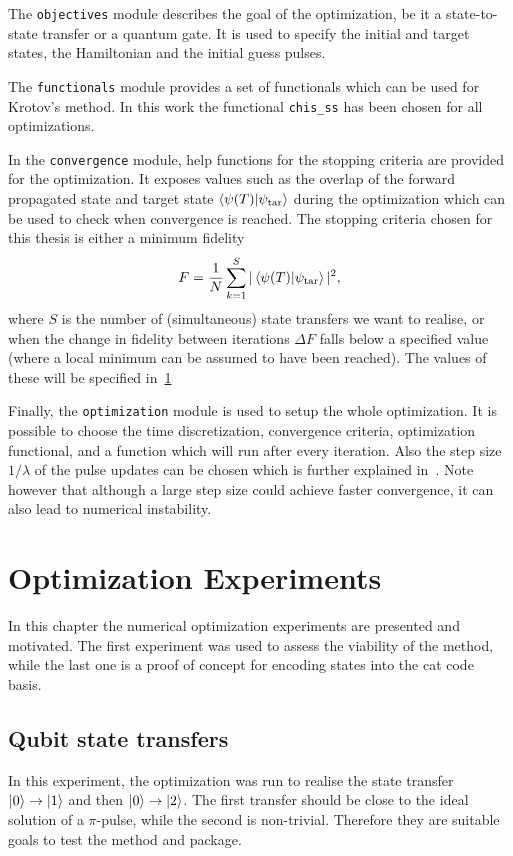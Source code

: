 \documentclass[main.tex]{subfiles}
\begin{document}
The \texttt{objectives} module describes the goal of the optimization, be it a state-to-state transfer or a quantum gate.
It is used to specify the initial and target states, the Hamiltonian and the initial guess pulses.

The \texttt{functionals} module provides a set of functionals which can be used for Krotov's method.
In this work the functional \texttt{chis\_ss} has been chosen for all optimizations.

In the \texttt{convergence} module, help functions for the stopping criteria are provided for the optimization.
It exposes values such as the overlap of the forward propagated state and target state \(\braket{\psi(T)}{\psi_{\text{tar}}}\) during the optimization which can be used to check when convergence is reached.
The stopping criteria chosen for this thesis is either a minimum fidelity
\begin{equation}
    F = \frac{1}{N}\sum_{k=1}^{S} |\braket{\psi(T)}{\psi_{\text{tar}}}|^2,
    \label{eq:total-fidelity}
\end{equation}
where \(S\) is the number of (simultaneous) state transfers we want to realise, or when the change in fidelity between iterations \(\Delta F\) falls below a specified value (where a local minimum can be assumed to have been reached).
The values of these will be specified in~\cref{sec:optimization-experiments}

Finally, the \texttt{optimization} module is used to setup the whole optimization.
It is possible to choose the time discretization, convergence criteria, optimization functional, and a function which will run after every iteration.
Also the step size \(1/\lambda\) of the pulse updates can be chosen which is further explained in~\cite{goerz_krotov:_2019}.
Note however that although a large step size could achieve faster convergence, it can also lead to numerical instability.

\section{Optimization Experiments}
\label{sec:optimization-experiments}
In this chapter the numerical optimization experiments are presented and motivated.
The first experiment was used to assess the viability of the method, while the last one is a proof of concept for encoding states into the cat code basis.

\subsection{Qubit state transfers}
In this experiment, the optimization was run to realise the state transfer \(\ket{0}\rightarrow\ket{1}\) and then \(\ket{0}\rightarrow\ket{2}\).
The first transfer should be close to the ideal solution of a \(\pi\)-pulse, while the second is non-trivial.
Therefore they are suitable goals to test the method and package.
\end{document}
